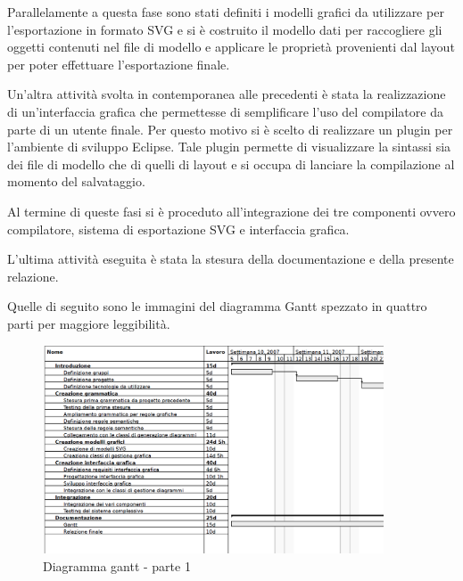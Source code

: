 Parallelamente a questa fase sono stati definiti i modelli grafici da utilizzare
per l'esportazione in formato SVG e si è costruito il modello dati per
raccogliere gli oggetti contenuti nel file di modello e applicare le proprietà
provenienti dal layout per poter effettuare l'esportazione finale.

Un'altra attività svolta in contemporanea alle precedenti è stata la
realizzazione di un'interfaccia grafica che permettesse di semplificare l'uso
del compilatore da parte di un utente finale. Per questo motivo si è scelto di
realizzare un plugin per l'ambiente di sviluppo Eclipse. Tale plugin permette di
visualizzare la sintassi sia dei file di modello che di quelli di layout e si
occupa di lanciare la compilazione al momento del salvataggio.

Al termine di queste fasi si è proceduto all'integrazione dei tre componenti
ovvero compilatore, sistema di esportazione SVG e interfaccia grafica.

L'ultima attività eseguita è stata la stesura della documentazione e della
presente relazione.

Quelle di seguito sono le immagini del diagramma Gantt spezzato in quattro parti
per maggiore leggibilità.

\begin{figure}[htp, label={gantt1}]
\begin{center}
  \includegraphics[width=0.9\textwidth]{img/gantt1}
  \caption[labelInTOC]{Diagramma gantt - parte 1}
  \label{gantt1}
\end{center}
\end{figure}

